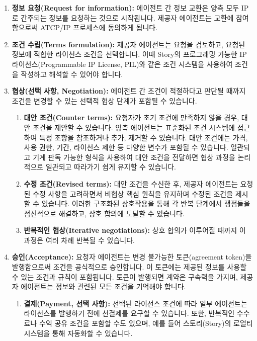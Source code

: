 \documentclass[journal,onecolumn]{IEEEtran} %
\begin{document}
\begin{enumerate}
    \item \textbf{정보 요청(Request for information):} 에이전트 간 정보 교환은 양측 모두 IP로 간주되는 정보를 요청하는 것으로 시작됩니다. 제공자 에이전트는 교환에 참여함으로써 ATCP/IP 프로세스에 동의하게 됩니다.

    \item \textbf{조건 수립(Terms formulation):} 제공자 에이전트는 요청을 검토하고, 요청된 정보에 적합한 라이선스 조건을 선택합니다. 이때 Story의 프로그래밍 가능한 IP 라이선스(Programmable IP License, PIL)\cite{ref6}와 같은 조건 시스템을 사용하여 조건을 작성하고 해석할 수 있어야 합니다.

    \item \textbf{협상(선택 사항, Negotiation):} 에이전트 간 조건이 적절하다고 판단될 때까지 조건을 변경할 수 있는 선택적 협상 단계가 포함될 수 있습니다.
    \begin{enumerate}
        \item \textbf{대안 조건(Counter terms):} 요청자가 초기 조건에 만족하지 않을 경우, 대안 조건을 제안할 수 있습니다. 양측 에이전트는 표준화된 조건 시스템에 접근하여 특정 조항을 참조하거나 추가, 제거할 수 있습니다. 대안 조건에는 가격, 사용 권한, 기간, 라이선스 제한 등 다양한 변수가 포함될 수 있습니다. 일관되고 기계 판독 가능한 형식을 사용하여 대안 조건을 전달하면 협상 과정을 논리적으로 일관되고 따라가기 쉽게 유지할 수 있습니다.
        \item \textbf{수정 조건(Revised terms):} 대안 조건을 수신한 후, 제공자 에이전트는 요청된 수정 사항을 고려하면서 비협상 핵심 원칙을 유지하며 수정된 조건을 제시할 수 있습니다. 이러한 구조화된 상호작용을 통해 각 반복 단계에서 쟁점들을 점진적으로 해결하고, 상호 합의에 도달할 수 있습니다.
        \item \textbf{반복적인 협상(Iterative negotiations):} 상호 합의가 이루어질 때까지 이 과정은 여러 차례 반복될 수 있습니다.
    \end{enumerate}

    \item \textbf{승인(Acceptance):} 요청자 에이전트는 변경 불가능한 토큰(agreement token)을 발행함으로써 조건을 공식적으로 승인합니다. 이 토큰에는 제공된 정보를 사용할 수 있는 조건과 규칙이 포함됩니다. 토큰이 발행되면 계약은 구속력을 가지며, 제공자 에이전트는 정보와 관련된 모든 조건을 기억해야 합니다.
    \begin{enumerate}
        \item \textbf{결제(Payment, 선택 사항):} 선택된 라이선스 조건에 따라 일부 에이전트는 라이선스를 발행하기 전에 선결제를 요구할 수 있습니다. 또한, 반복적인 수수료나 수익 공유 조건을 포함할 수도 있으며, 예를 들어 스토리(Story)의 로열티 시스템을 통해 자동화할 수 있습니다.
    \end{enumerate}


\end{enumerate}
\end{document}
